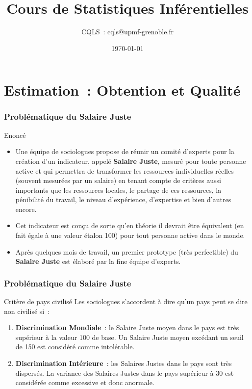 \documentclass[11pt]{beamer}
\title[Problématiques Produits A et B]
{Cours de Statistiques Inférentielles}
\author{CQLS~: cqls@upmf-grenoble.fr}
\date{\today}
\begin{document}
\maketitle



\section[Estimation]{Estimation~: Obtention et Qualité}

\begin{frame}
\frametitle{Problématique du Salaire Juste}
\begin{exampleblock}{Enoncé}
\begin{itemize}
\item  Une équipe de sociologues propose de réunir un comité d'experts pour la création d'un indicateur, appelé \textbf{Salaire Juste}, mesuré pour toute personne active et qui permettra de transformer les ressources individuelles réelles (souvent mesurées par un salaire) en tenant compte de critères aussi importants que les ressources locales, le partage de ces ressources, la pénibilité du travail, le niveau d'expérience, d'expertise et bien d'autres encore.
\item Cet indicateur est conçu de sorte qu'en théorie il devrait être équivalent (en fait égale à une valeur étalon 100) pour tout personne active dans le monde.
\item Après quelques mois de travail, un premier prototype (très perfectible) du \textbf{Salaire Juste} est élaboré par la fine équipe d'experts.
\end{itemize}
\end{exampleblock}
\end{frame}


\begin{frame}
\frametitle{Problématique du Salaire Juste}

\begin{alertblock}{Critère de pays civilisé}
Les sociologues s'accordent à dire qu'un pays peut se dire non civilisé si~:
\begin{enumerate} 
\item \textbf{Discrimination Mondiale}~: le Salaire Juste moyen dans le pays est très supérieur à  la valeur 100 de base. Un Salaire Juste moyen excédant un seuil de 150 est considéré comme intolérable.
\item \textbf{Discrimination Intérieure}~: les Salaires Justes dans le pays sont très dispersés. La variance des Salaires Justes dans le pays supérieur à 30 est considérée comme excessive et donc anormale.
\end{enumerate}
\end{alertblock}
\end{frame}
\end{document}
